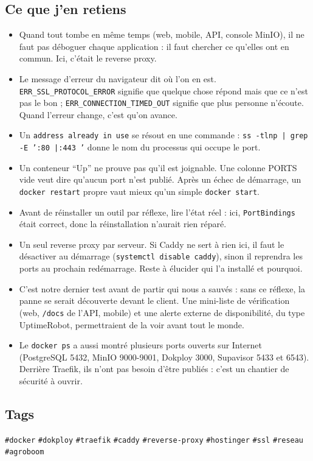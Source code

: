 \documentclass[10pt,twoside,openany]{article}
\newcommand{\tag}[1]{\texttt{\footnotesize\color{tagolive}\#{#1}}}
\begin{document}
\subsection*{Ce que j'en retiens}
\begin{itemize}
  \item Quand tout tombe en même temps (web, mobile, API, console MinIO), il ne faut pas déboguer chaque application : il faut chercher ce qu'elles ont en commun. Ici, c'était le reverse proxy.
  \item Le message d'erreur du navigateur dit où l'on en est. \texttt{ERR\_SSL\_PROTOCOL\_ERROR} signifie que quelque chose répond mais que ce n'est pas le bon ; \texttt{ERR\_CONNECTION\_TIMED\_OUT} signifie que plus personne n'écoute. Quand l'erreur change, c'est qu'on avance.
  \item Un \texttt{address already in use} se résout en une commande : \texttt{ss -tlnp | grep -E ':80 |:443 '} donne le nom du processus qui occupe le port.
  \item Un conteneur \enquote{Up} ne prouve pas qu'il est joignable. Une colonne PORTS vide veut dire qu'aucun port n'est publié. Après un échec de démarrage, un \texttt{docker restart} propre vaut mieux qu'un simple \texttt{docker start}.
  \item Avant de réinstaller un outil par réflexe, lire l'état réel : ici, \texttt{PortBindings} était correct, donc la réinstallation n'aurait rien réparé.
  \item Un seul reverse proxy par serveur. Si Caddy ne sert à rien ici, il faut le désactiver au démarrage (\texttt{systemctl disable caddy}), sinon il reprendra les ports au prochain redémarrage. Reste à élucider qui l'a installé et pourquoi.
  \item C'est notre dernier test avant de partir qui nous a sauvés : sans ce réflexe, la panne se serait découverte devant le client. Une mini-liste de vérification (web, \texttt{/docs} de l'API, mobile) et une alerte externe de disponibilité, du type UptimeRobot, permettraient de la voir avant tout le monde.
  \item Le \texttt{docker ps} a aussi montré plusieurs ports ouverts sur Internet (PostgreSQL 5432, MinIO 9000-9001, Dokploy 3000, Supavisor 5433 et 6543). Derrière Traefik, ils n'ont pas besoin d'être publiés : c'est un chantier de sécurité à ouvrir.
\end{itemize}

\subsection*{Tags}
\tag{docker} \quad \tag{dokploy} \quad \tag{traefik} \quad \tag{caddy} \quad \tag{reverse-proxy} \quad \tag{hostinger} \quad \tag{ssl} \quad \tag{reseau} \quad \tag{agroboom}
\end{document}
